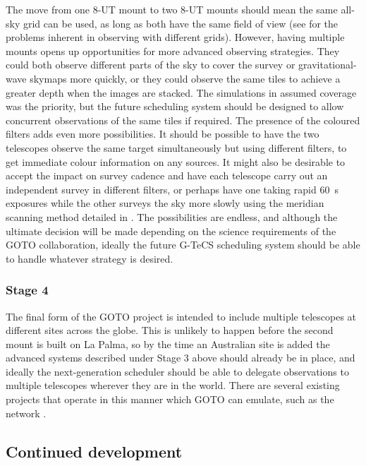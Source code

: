\begin{colsection}
\begin{colsection}
The move from one 8-UT mount to two 8-UT mounts should mean the same all-sky grid can be used, as long as both have the same field of view (see  for the problems inherent in observing with different grids). However, having multiple mounts opens up opportunities for more advanced observing strategies. They could both observe different parts of the sky to cover the survey or gravitational-wave skymaps more quickly, or they could observe the same tiles to achieve a greater depth when the images are stacked. The simulations in  assumed coverage was the priority, but the future scheduling system should be designed to allow concurrent observations of the same tiles if required. The presence of the coloured filters adds even more possibilities. It should be possible to have the two telescopes observe the same target simultaneously but using different filters, to get immediate colour information on any sources. It might also be desirable to accept the impact on survey cadence and have each telescope carry out an independent survey in different filters, or perhaps have one taking rapid \SI{60}{\second} exposures while the other surveys the sky more slowly using the meridian scanning method detailed in . The possibilities are endless, and although the ultimate decision will be made depending on the science requirements of the GOTO collaboration, ideally the future G-TeCS scheduling system should be able to handle whatever strategy is desired.

\subsubsection{Stage 4}

The final form of the GOTO project is intended to include multiple telescopes at different sites across the globe. This is unlikely to happen before the second mount is built on La Palma, so by the time an Australian site is added the advanced systems described under Stage 3 above should already be in place, and ideally the next-generation scheduler should be able to delegate observations to multiple telescopes wherever they are in the world. There are several existing projects that operate in this manner which GOTO can emulate, such as the  network \citep{LCO_scheduling}.

\end{colsection}

\newpage
\subsection{Continued development}
\label{sec:software_future}
\begin{colsection}


\end{colsection}
\end{colsection}
